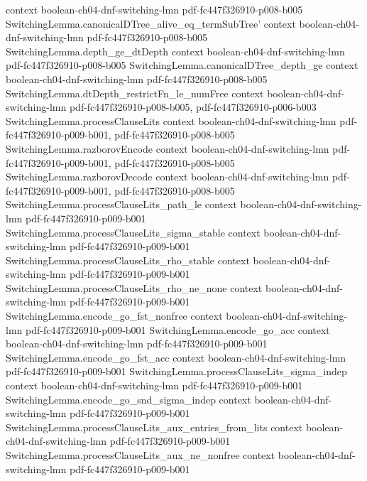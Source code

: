 \begin{lemma}
  {context}
  {boolean-ch04-dnf-switching-lmn}
  {pdf-fc447f326910-p008-b005}
\proofstep
  {SwitchingLemma.canonicalDTree_alive_eq_termSubTree'}
  {context}
  {boolean-ch04-dnf-switching-lmn}
  {pdf-fc447f326910-p008-b005}
\proofstep
  {SwitchingLemma.depth_ge_dtDepth}
  {context}
  {boolean-ch04-dnf-switching-lmn}
  {pdf-fc447f326910-p008-b005}
\proofstep
  {SwitchingLemma.canonicalDTree_depth_ge}
  {context}
  {boolean-ch04-dnf-switching-lmn}
  {pdf-fc447f326910-p008-b005}
\proofstep
  {SwitchingLemma.dtDepth_restrictFn_le_numFree}
  {context}
  {boolean-ch04-dnf-switching-lmn}
  {pdf-fc447f326910-p008-b005,
    pdf-fc447f326910-p006-b003}
\proofstep
  {SwitchingLemma.processClauseLits}
  {context}
  {boolean-ch04-dnf-switching-lmn}
  {pdf-fc447f326910-p009-b001,
    pdf-fc447f326910-p008-b005}
\proofstep
  {SwitchingLemma.razborovEncode}
  {context}
  {boolean-ch04-dnf-switching-lmn}
  {pdf-fc447f326910-p009-b001,
    pdf-fc447f326910-p008-b005}
\proofstep
  {SwitchingLemma.razborovDecode}
  {context}
  {boolean-ch04-dnf-switching-lmn}
  {pdf-fc447f326910-p009-b001,
    pdf-fc447f326910-p008-b005}
\proofstep
  {SwitchingLemma.processClauseLits_path_le}
  {context}
  {boolean-ch04-dnf-switching-lmn}
  {pdf-fc447f326910-p009-b001}
\proofstep
  {SwitchingLemma.processClauseLits_sigma_stable}
  {context}
  {boolean-ch04-dnf-switching-lmn}
  {pdf-fc447f326910-p009-b001}
\proofstep
  {SwitchingLemma.processClauseLits_rho_stable}
  {context}
  {boolean-ch04-dnf-switching-lmn}
  {pdf-fc447f326910-p009-b001}
\proofstep
  {SwitchingLemma.processClauseLits_rho_ne_none}
  {context}
  {boolean-ch04-dnf-switching-lmn}
  {pdf-fc447f326910-p009-b001}
\proofstep
  {SwitchingLemma.encode_go_fst_nonfree}
  {context}
  {boolean-ch04-dnf-switching-lmn}
  {pdf-fc447f326910-p009-b001}
\proofstep
  {SwitchingLemma.encode_go_acc}
  {context}
  {boolean-ch04-dnf-switching-lmn}
  {pdf-fc447f326910-p009-b001}
\proofstep
  {SwitchingLemma.encode_go_fst_acc}
  {context}
  {boolean-ch04-dnf-switching-lmn}
  {pdf-fc447f326910-p009-b001}
\proofstep
  {SwitchingLemma.processClauseLits_sigma_indep}
  {context}
  {boolean-ch04-dnf-switching-lmn}
  {pdf-fc447f326910-p009-b001}
\proofstep
  {SwitchingLemma.encode_go_snd_sigma_indep}
  {context}
  {boolean-ch04-dnf-switching-lmn}
  {pdf-fc447f326910-p009-b001}
\proofstep
  {SwitchingLemma.processClauseLits_aux_entries_from_lits}
  {context}
  {boolean-ch04-dnf-switching-lmn}
  {pdf-fc447f326910-p009-b001}
\proofstep
  {SwitchingLemma.processClauseLits_aux_ne_nonfree}
  {context}
  {boolean-ch04-dnf-switching-lmn}
  {pdf-fc447f326910-p009-b001}

\end{lemma}
